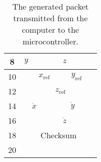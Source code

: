 \begin{table}[H]
\begin{tabular}{lclllllllllllllll}
		\multicolumn{1}{|c|}{8}    & \multicolumn{7}{c|}{$y$}                                                                                                                                                     & \multicolumn{9}{c|}{$z$}                                                                                                                                                                                                             \\ \hline
		\multicolumn{1}{|c|}{10}  & \multicolumn{1}{c|}{}  & \multicolumn{10}{c|}{$x_{\mathrm{ref}}$}              & \multicolumn{5}{c|}{$y_{\mathrm{ref}}$}                                                                                                  \\ \hline
		\multicolumn{1}{|c|}{12}   & \multicolumn{5}{c|}{}                                                                                                      & \multicolumn{10}{c|}{$z_{\mathrm{ref}}$}                                                                                                                                                                                                                              & \multicolumn{1}{c|}{}   \\ \hline
		\multicolumn{1}{|c|}{14}   & \multicolumn{10}{c|}{$\dot{x}$}& \multicolumn{6}{c|}{$\dot{y}$}                                                       \\ \hline
		\multicolumn{1}{|c|}{16}   & \multicolumn{5}{c|}{}                                                                                                      & \multicolumn{11}{c|}{$\dot{z}$}                                                                                                                                                                                                                                                        \\ \hline
		\multicolumn{1}{|c|}{18}   & \multicolumn{16}{c|}{Checksum}                                                       \\ \hline
		\multicolumn{1}{|c|}{20}  & \multicolumn{8}{c|}{}                                                                                                                                                                                 & \multicolumn{1}{c|}{}  & \multicolumn{1}{c|}{}  & \multicolumn{1}{c|}{}   & \multicolumn{1}{c|}{}   & \multicolumn{1}{c|}{}   & \multicolumn{1}{c|}{}   & \multicolumn{1}{c|}{}   & \multicolumn{1}{c|}{}   \\ \hline
	\end{tabular}
	\caption{The generated packet transmitted from the computer to the microcontroller.}
	\label{tab:packetstructure2}
\end{table}
